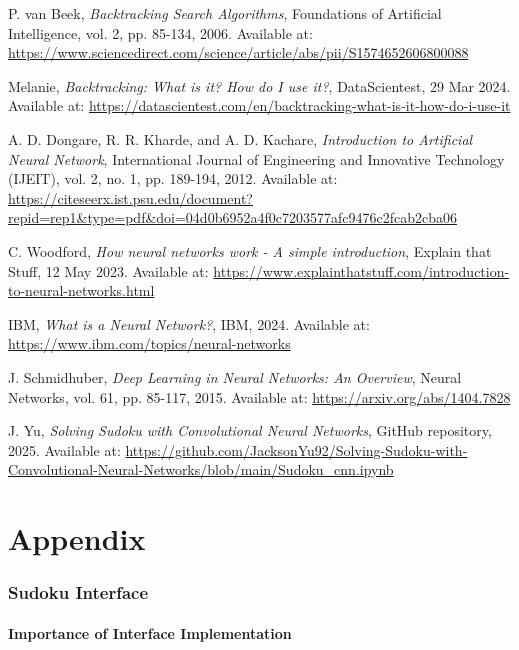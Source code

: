 \documentclass[]{final_report}
\begin{document}
\begin{thebibliography}{99}
 P. van Beek, \textit{Backtracking Search Algorithms}, Foundations of Artificial Intelligence, vol. 2, pp. 85-134, 2006. Available at: \url{https://www.sciencedirect.com/science/article/abs/pii/S1574652606800088}

 Melanie, \textit{Backtracking: What is it? How do I use it?}, DataScientest, 29 Mar 2024. Available at: \url{https://datascientest.com/en/backtracking-what-is-it-how-do-i-use-it}

 A. D. Dongare, R. R. Kharde, and A. D. Kachare, \textit{Introduction to Artificial Neural Network}, International Journal of Engineering and Innovative Technology (IJEIT), vol. 2, no. 1, pp. 189-194, 2012. Available at: \url{https://citeseerx.ist.psu.edu/document?repid=rep1&type=pdf&doi=04d0b6952a4f0c7203577afc9476c2fcab2cba06} 

 C. Woodford, \textit{How neural networks work - A simple introduction}, Explain that Stuff, 12 May 2023. Available at: \url{https://www.explainthatstuff.com/introduction-to-neural-networks.html} 

 IBM, \textit{What is a Neural Network?}, IBM, 2024. Available at: \url{https://www.ibm.com/topics/neural-networks} 

 J. Schmidhuber, \textit{Deep Learning in Neural Networks: An Overview}, Neural Networks, vol. 61, pp. 85-117, 2015. Available at: \url{https://arxiv.org/abs/1404.7828}

 J. Yu, \textit{Solving Sudoku with Convolutional Neural Networks}, GitHub repository, 2025. Available at: \url{https://github.com/JacksonYu92/Solving-Sudoku-with-Convolutional-Neural-Networks/blob/main/Sudoku_cnn.ipynb}

\end{thebibliography}
\label{endpage}

\chapter*{Appendix}
\subsection*{Sudoku Interface}

\subsubsection{Importance of Interface Implementation}
\end{document}
